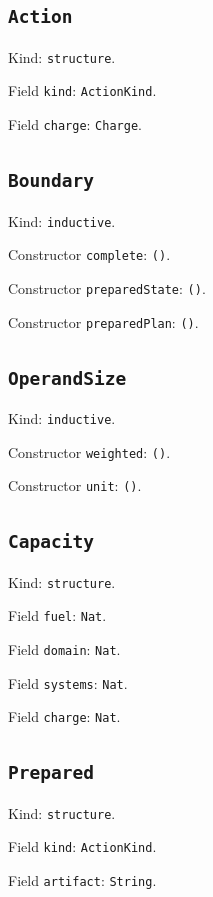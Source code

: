 \documentclass[11pt]{article}
\begin{document}
\subsection*{\texttt{Action}}
\noindent Kind: \texttt{structure}.\par
\noindent Field \texttt{kind}: \texttt{ActionKind}.\par
\noindent Field \texttt{charge}: \texttt{Charge}.\par
\subsection*{\texttt{Boundary}}
\noindent Kind: \texttt{inductive}.\par
\noindent Constructor \texttt{complete}: \texttt{()}.\par
\noindent Constructor \texttt{preparedState}: \texttt{()}.\par
\noindent Constructor \texttt{preparedPlan}: \texttt{()}.\par
\subsection*{\texttt{OperandSize}}
\noindent Kind: \texttt{inductive}.\par
\noindent Constructor \texttt{weighted}: \texttt{()}.\par
\noindent Constructor \texttt{unit}: \texttt{()}.\par
\subsection*{\texttt{Capacity}}
\noindent Kind: \texttt{structure}.\par
\noindent Field \texttt{fuel}: \texttt{Nat}.\par
\noindent Field \texttt{domain}: \texttt{Nat}.\par
\noindent Field \texttt{systems}: \texttt{Nat}.\par
\noindent Field \texttt{charge}: \texttt{Nat}.\par
\subsection*{\texttt{Prepared}}
\noindent Kind: \texttt{structure}.\par
\noindent Field \texttt{kind}: \texttt{ActionKind}.\par
\noindent Field \texttt{artifact}: \texttt{String}.\par
\end{document}
